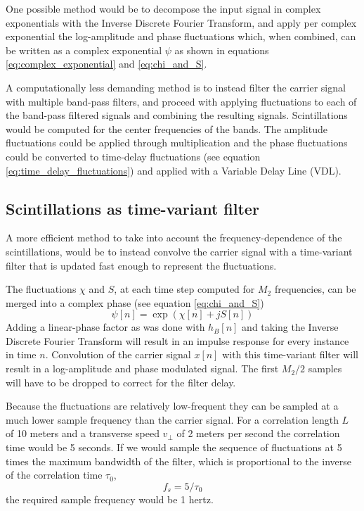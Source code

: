 One possible method would be to decompose the input signal in complex
exponentials with the Inverse Discrete Fourier Transform, and apply per complex
exponential the log-amplitude and phase fluctuations which, when combined, can be
written as a complex exponential $\psi$ as shown in equations
\eqref{eq:complex_exponential} and \eqref{eq:chi_and_S}.

A computationally less demanding method is to instead filter the carrier signal
with multiple band-pass filters, and proceed with applying fluctuations to each
of the band-pass filtered signals and combining the resulting signals.
Scintillations would be computed for the center frequencies of the bands. The amplitude
fluctuations could be applied through multiplication and the phase
fluctuations could be converted to time-delay fluctuations (see equation
\eqref{eq:time_delay_fluctuations}) and applied with a Variable Delay Line (VDL).


\subsection{Scintillations as time-variant filter}
A more efficient method to take into account the frequency-dependence
of the scintillations, would be to instead convolve the carrier signal with a
time-variant filter that is updated fast enough to represent the fluctuations.

The fluctuations $\chi$ and $S$, at each time step computed for $M_2$ frequencies, can be merged into a complex phase (see equation \eqref{eq:chi_and_S})
\begin{equation}
 \psi[n] = \exp\left({\chi[n] + jS[n] }\right)
\end{equation}
Adding a linear-phase factor as was done with $h_B[n]$ and taking the Inverse
Discrete Fourier Transform will result in an impulse response for every instance
in time $n$. Convolution of the carrier signal $x[n]$ with this time-variant
filter will result in a log-amplitude and phase modulated signal. The first
$M_2/2$ samples will have to be dropped to correct for the filter delay.

Because the fluctuations are relatively low-frequent they can be sampled at a
much lower sample frequency than the carrier signal. For a correlation length
$L$ of 10 meters and a transverse speed $v_{\bot}$ of 2 meters per second the
correlation time would be 5 seconds. If we would sample the sequence of
fluctuations at 5 times the maximum bandwidth of the filter, which is
proportional to the inverse of the correlation time $\tau_0$,
\begin{equation}
 f_s = 5 / \tau_0
\end{equation}
the required sample frequency would be 1 hertz.

